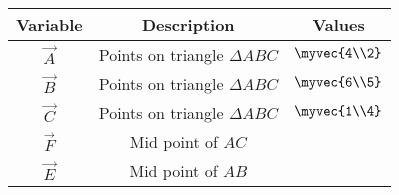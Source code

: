 \begin{tabular}[12pt]{ |c| c| c|}
    \hline
    \textbf{Variable} & \textbf{Description} & \textbf{Values} \\ 
    \hline
    $\vec{A}$ & Points on triangle $\Delta{ABC}$ & $\myvec{4\\2}$ \\
    \hline
    $\vec{B}$ & Points on triangle $\Delta{ABC}$ & $\myvec{6\\5}$ \\
    \hline
    $\vec{C}$ & Points on triangle $\Delta{ABC}$ & $\myvec{1\\4}$ \\
    \hline
    $\vec{F}$ &  Mid point of $AC$ & \\
    \hline 
    $\vec{E}$ &  Mid point of $AB$ & \\
    \hline   
    \end{tabular}
